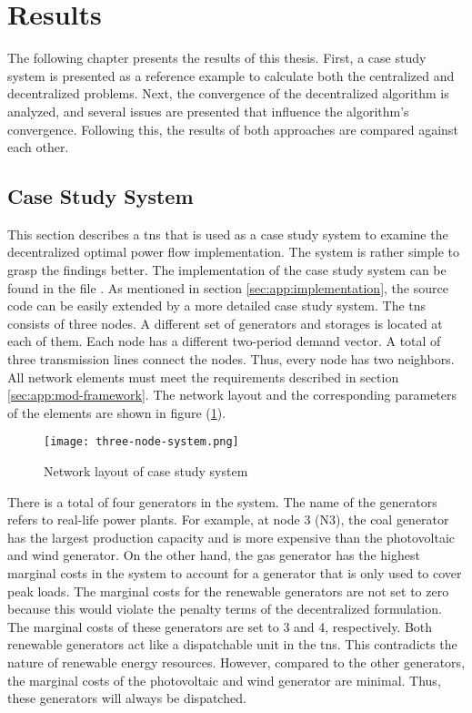 \section{Results}
\label{sec:res}

The following chapter presents the results of this thesis. First, a case study system is presented as a reference example to calculate both the centralized and decentralized problems. Next, the convergence of the decentralized algorithm is analyzed, and several issues are presented that influence the algorithm's convergence. Following this, the results of both approaches are compared against each other.

\subsection{Case Study System}
\label{sec:res:tns}

This section describes a \gls{tns} that is used as a case study system to examine the decentralized optimal power flow implementation. The system is rather simple to grasp the findings better. The implementation of the case study system can be found in the file . As mentioned in section \ref{sec:app:implementation}, the source code can be easily extended by a more detailed case study system. The \gls{tns} consists of three nodes. A different set of generators and storages is located at each of them. Each node has a different two-period demand vector. A total of three transmission lines connect the nodes. Thus, every node has two neighbors. All network elements must meet the requirements described in section \ref{sec:app:mod-framework}. The network layout and the corresponding parameters of the elements are shown in figure (\ref{fig:tns}).

\begin{figure}[h]
	\centering
	\texttt{[image: three-node-system.png]}
	\caption{Network layout of case study system}
	\label{fig:tns}
\end{figure}

There is a total of four generators in the system. The name of the generators refers to real-life power plants. For example, at node 3 (N3), the coal generator has the largest production capacity and is more expensive than the photovoltaic and wind generator. On the other hand, the gas generator has the highest marginal costs in the system to account for a generator that is only used to cover peak loads. The marginal costs for the renewable generators are not set to zero because this would violate the penalty terms of the decentralized formulation. The marginal costs of these generators are set to 3 and 4, respectively. Both renewable generators act like a dispatchable unit in the \gls{tns}. This contradicts the nature of renewable energy resources. However, compared to the other generators, the marginal costs of the photovoltaic and wind generator are minimal. Thus, these generators will always be dispatched.

